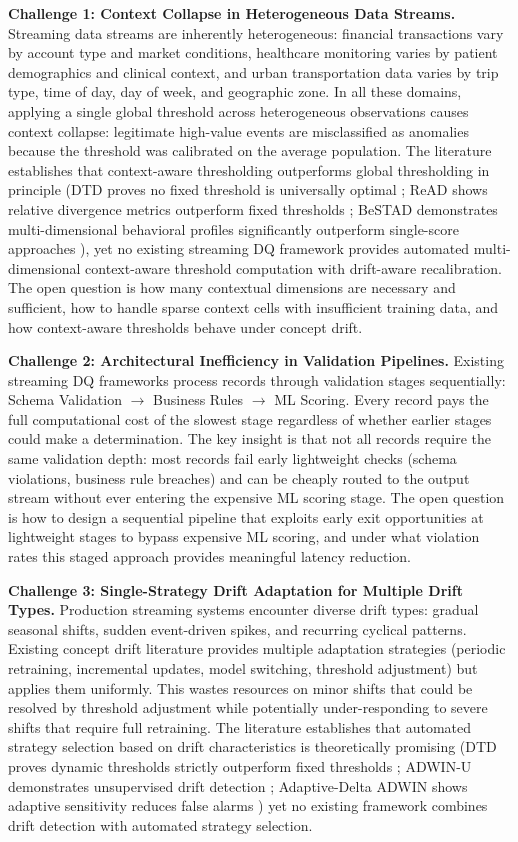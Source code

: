 \textbf{Challenge 1: Context Collapse in Heterogeneous Data Streams.} Streaming data streams are inherently heterogeneous: financial transactions vary by account type and market conditions, healthcare monitoring varies by patient demographics and clinical context, and urban transportation data varies by trip type, time of day, day of week, and geographic zone. In all these domains, applying a single global threshold across heterogeneous observations causes context collapse: legitimate high-value events are misclassified as anomalies because the threshold was calibrated on the average population. The literature establishes that context-aware thresholding outperforms global thresholding in principle (DTD proves no fixed threshold is universally optimal \citep{dtd2026}; ReAD shows relative divergence metrics outperform fixed thresholds \citep{read2020}; BeSTAD demonstrates multi-dimensional behavioral profiles significantly outperform single-score approaches \citep{bestad2025}), yet no existing streaming DQ framework provides automated multi-dimensional context-aware threshold computation with drift-aware recalibration. The open question is how many contextual dimensions are necessary and sufficient, how to handle sparse context cells with insufficient training data, and how context-aware thresholds behave under concept drift.

\textbf{Challenge 2: Architectural Inefficiency in Validation Pipelines.} Existing streaming DQ frameworks process records through validation stages sequentially: Schema Validation $\rightarrow$ Business Rules $\rightarrow$ ML Scoring. Every record pays the full computational cost of the slowest stage regardless of whether earlier stages could make a determination. The key insight is that not all records require the same validation depth: most records fail early lightweight checks (schema violations, business rule breaches) and can be cheaply routed to the output stream without ever entering the expensive ML scoring stage. The open question is how to design a sequential pipeline that exploits early exit opportunities at lightweight stages to bypass expensive ML scoring, and under what violation rates this staged approach provides meaningful latency reduction.

\textbf{Challenge 3: Single-Strategy Drift Adaptation for Multiple Drift Types.} Production streaming systems encounter diverse drift types: gradual seasonal shifts, sudden event-driven spikes, and recurring cyclical patterns. Existing concept drift literature provides multiple adaptation strategies (periodic retraining, incremental updates, model switching, threshold adjustment) but applies them uniformly. This wastes resources on minor shifts that could be resolved by threshold adjustment while potentially under-responding to severe shifts that require full retraining. The literature establishes that automated strategy selection based on drift characteristics is theoretically promising (DTD proves dynamic thresholds strictly outperform fixed thresholds \citep{dtd2026}; ADWIN-U demonstrates unsupervised drift detection \citep{adwin2025}; Adaptive-Delta ADWIN shows adaptive sensitivity reduces false alarms \citep{adt2025}) yet no existing framework combines drift detection with automated strategy selection.

